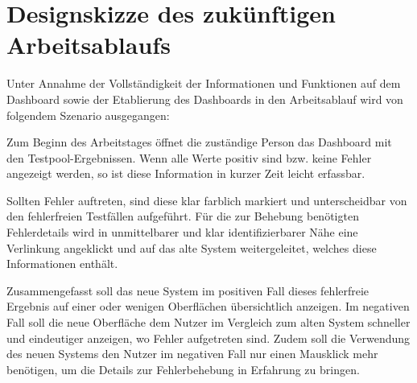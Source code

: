 \section{Designskizze des zukünftigen Arbeitsablaufs}
\label{ch:Dashboard:sec:Workflow}

Unter Annahme der Vollständigkeit der Informationen und Funktionen auf dem Dash\-board sowie der Etablierung des Dash\-boards in den Arbeitsablauf wird von folgendem Szenario ausgegangen:

Zum Beginn des Arbeitstages öffnet die zuständige Person das Dash\-board mit den Testpool-Ergebnissen. Wenn alle Werte positiv sind bzw. keine Fehler angezeigt werden, so ist diese Information in kurzer Zeit leicht erfassbar.

Sollten Fehler auftreten, sind diese klar farblich markiert und unterscheidbar von den fehlerfreien Testfällen aufgeführt. Für die zur Behebung benötigten Fehlerdetails wird in unmittelbarer und klar identifizierbarer Nähe eine Verlinkung angeklickt und auf das alte System weitergeleitet, welches diese Informationen enthält.

Zusammengefasst soll das neue System im positiven Fall dieses fehlerfreie Ergebnis auf einer oder wenigen Oberflächen übersichtlich anzeigen. Im negativen Fall soll die neue Oberfläche dem Nutzer im Vergleich zum alten System schneller und eindeutiger anzeigen, wo Fehler aufgetreten sind. Zudem soll die Verwendung des neuen Systems den Nutzer im negativen Fall nur einen Mausklick mehr benötigen, um die Details zur Fehlerbehebung in Erfahrung zu bringen.
